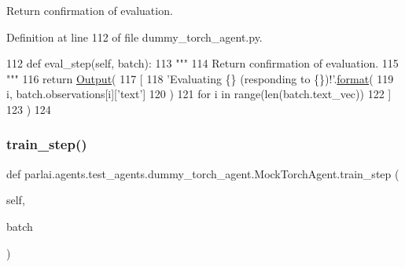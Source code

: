 \begin{DoxyVerb}Return confirmation of evaluation.
\end{DoxyVerb}
 

Definition at line 112 of file dummy\+\_\+torch\+\_\+agent.\+py.


\begin{DoxyCode}
112     \textcolor{keyword}{def }eval\_step(self, batch):
113         \textcolor{stringliteral}{"""}
114 \textcolor{stringliteral}{        Return confirmation of evaluation.}
115 \textcolor{stringliteral}{        """}
116         \textcolor{keywordflow}{return} \hyperlink{namespaceparlai_1_1agents_1_1legacy__agents_1_1seq2seq_1_1torch__agent__v1_a2689006ea97d09413fb242f984bd8016}{Output}(
117             [
118                 \textcolor{stringliteral}{'Evaluating \{\} (responding to \{\})!'}.\hyperlink{namespaceparlai_1_1chat__service_1_1services_1_1messenger_1_1shared__utils_a32e2e2022b824fbaf80c747160b52a76}{format}(
119                     i, batch.observations[i][\textcolor{stringliteral}{'text'}]
120                 )
121                 \textcolor{keywordflow}{for} i \textcolor{keywordflow}{in} range(len(batch.text\_vec))
122             ]
123         )
124 \end{DoxyCode}
\mbox{\label{classparlai_1_1agents_1_1test__agents_1_1dummy__torch__agent_1_1MockTorchAgent_a867115faed3455518fb1f9a0ab41f761}} 
\subsubsection{\texorpdfstring{train\+\_\+step()}{train\_step()}}
{\footnotesize\ttfamily def parlai.\+agents.\+test\+\_\+agents.\+dummy\+\_\+torch\+\_\+agent.\+Mock\+Torch\+Agent.\+train\+\_\+step (\begin{DoxyParamCaption}\item[{}]{self,  }\item[{}]{batch }\end{DoxyParamCaption})}

